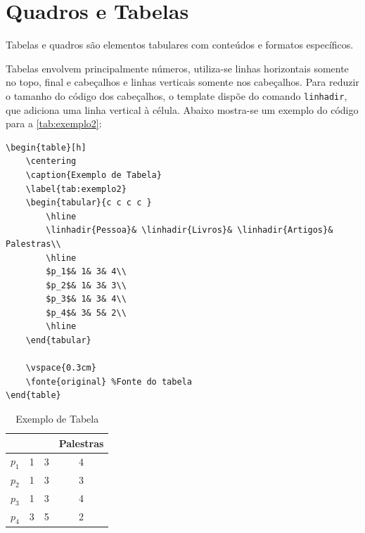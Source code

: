 \section{Quadros e Tabelas}

Tabelas e quadros são elementos tabulares com conteúdos e formatos específicos. 

Tabelas envolvem principalmente números, utiliza-se linhas horizontais somente no topo, final e cabeçalhos e linhas verticais somente nos cabeçalhos. Para reduzir o tamanho do código dos cabeçalhos, o template dispõe do comando \texttt{linhadir}, que adiciona uma linha vertical à célula. Abaixo mostra-se um exemplo do código para a \autoref{tab:exemplo2}:

\begin{lstlisting}[language={[LaTeX]Tex}]
\begin{table}[h]
	\centering
	\caption{Exemplo de Tabela} 
	\label{tab:exemplo2}
	\begin{tabular}{c c c c }
		\hline
		\linhadir{Pessoa}& \linhadir{Livros}& \linhadir{Artigos}& Palestras\\
		\hline
		$p_1$& 1& 3& 4\\
		$p_2$& 1& 3& 3\\
		$p_3$& 1& 3& 4\\
		$p_4$& 3& 5& 2\\
		\hline 
	\end{tabular}
	
	\vspace{0.3cm}
	\fonte{original} %Fonte do tabela
\end{table}
\end{lstlisting}

\begin{table}[h]
	\centering
	\caption{Exemplo de Tabela} 
	\label{tab:exemplo2}
	\begin{tabular}{c c c c }
		\hline
		\linhadir{\bf Pessoa} & \linhadir{\bf Livros} & \linhadir{\bf Artigos} & \bf Palestras \\
		\hline
		$p_1$ & 1 & 3 & 4 \\
		$p_2$ & 1 & 3 & 3 \\
		$p_3$ & 1 & 3 & 4 \\
		$p_4$ & 3 & 5 & 2 \\
		\hline 
	\end{tabular}
	
	\vspace{0.3cm}
\end{table}


